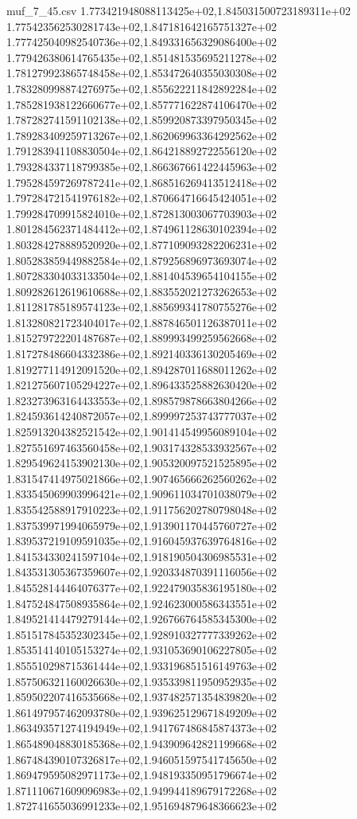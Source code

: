 \begin{filecontents*}{muf_7_45.csv}
1.773421948088113425e+02,1.845031500723189311e+02
1.775423562530281743e+02,1.847181642165751327e+02
1.777425040982540736e+02,1.849331656329086400e+02
1.779426380614765435e+02,1.851481535695211278e+02
1.781279923865748458e+02,1.853472640355030308e+02
1.783280998874276975e+02,1.855622211842892284e+02
1.785281938122660677e+02,1.857771622874106470e+02
1.787282741591102138e+02,1.859920873397950345e+02
1.789283409259713267e+02,1.862069963364292562e+02
1.791283941108830504e+02,1.864218892722556120e+02
1.793284337118799385e+02,1.866367661422445963e+02
1.795284597269787241e+02,1.868516269413512418e+02
1.797284721541976182e+02,1.870664716645424051e+02
1.799284709915824010e+02,1.872813003067703903e+02
1.801284562371484412e+02,1.874961128630102394e+02
1.803284278889520920e+02,1.877109093282206231e+02
1.805283859449882584e+02,1.879256896973693074e+02
1.807283304033133504e+02,1.881404539654104155e+02
1.809282612619610688e+02,1.883552021273262653e+02
1.811281785189574123e+02,1.885699341780755276e+02
1.813280821723404017e+02,1.887846501126387011e+02
1.815279722201487687e+02,1.889993499259562668e+02
1.817278486604332386e+02,1.892140336130205469e+02
1.819277114912091520e+02,1.894287011688011262e+02
1.821275607105294227e+02,1.896433525882630420e+02
1.823273963164433553e+02,1.898579878663804266e+02
1.824593614240872057e+02,1.899997253743777037e+02
1.825913204382521542e+02,1.901414549956089104e+02
1.827551697463560458e+02,1.903174328533932567e+02
1.829549624153902130e+02,1.905320097521525895e+02
1.831547414975021866e+02,1.907465666262560262e+02
1.833545069903996421e+02,1.909611034701038079e+02
1.835542588917910223e+02,1.911756202780798048e+02
1.837539971994065979e+02,1.913901170445760727e+02
1.839537219109591035e+02,1.916045937639764816e+02
1.841534330241597104e+02,1.918190504306985531e+02
1.843531305367359607e+02,1.920334870391116056e+02
1.845528144464076377e+02,1.922479035836195180e+02
1.847524847508935864e+02,1.924623000586343551e+02
1.849521414479279144e+02,1.926766764585345300e+02
1.851517845352302345e+02,1.928910327777339262e+02
1.853514140105153274e+02,1.931053690106227805e+02
1.855510298715361444e+02,1.933196851516149763e+02
1.857506321160026630e+02,1.935339811950952935e+02
1.859502207416535668e+02,1.937482571354839820e+02
1.861497957462093780e+02,1.939625129671849209e+02
1.863493571274194949e+02,1.941767486845874373e+02
1.865489048830185368e+02,1.943909642821199668e+02
1.867484390107326817e+02,1.946051597541745650e+02
1.869479595082971173e+02,1.948193350951796674e+02
1.871110671609096983e+02,1.949944189679172268e+02
1.872741655036991233e+02,1.951694879648366623e+02

\end{filecontents*}
